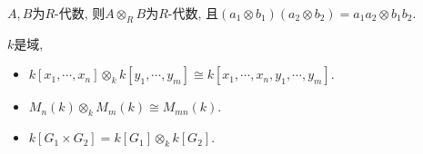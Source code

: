 \begin{proposition}
    $A, B$为$R$-代数, 则$A\otimes_R B$为$R$-代数, 
    且$(a_1\otimes b_1)(a_2\otimes b_2)=a_1a_2\otimes b_1b_2$.
\end{proposition}

\begin{example} $k$是域, 
    \begin{itemize} 
        \item[1.] $k[x_1,\cdots,x_n]\otimes_k k[y_1,\cdots, y_m]\cong k[x_1,\cdots,x_n,y_1,\cdots,y_m]$.
        \item[2.] $M_n(k)\otimes_k M_m(k)\cong M_{mn}(k)$.
        \item[3.] $k[G_1\times G_2]=k[G_1]\otimes_k k[G_2]$. 
    \end{itemize}
\end{example}


